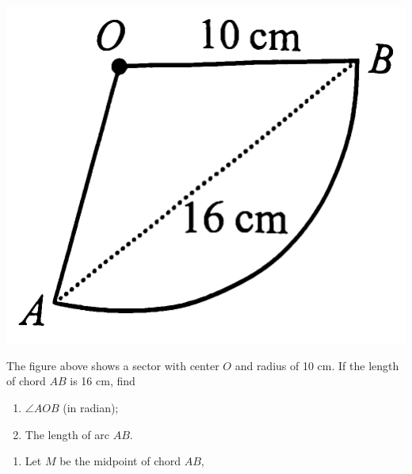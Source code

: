 \documentclass{report}
\begin{document}
\begin{question}
	\begin{center}
		\includegraphics[scale=0.09]{assets/8-6.png}
	\end{center}
	\noindent The figure above shows a sector with center $O$ and radius of 10 cm. If the length of chord $AB$ is 16 cm, find
	\vspace{-1em}
	\begin{multicols}{2}
		\begin{enumerate}[label=(\alph*)]
			\item $\angle AOB$ (in radian);
			\item The length of arc $AB$.
		\end{enumerate}
	\end{multicols}
	\vspace{-1em}
	\sol{}
	\begin{enumerate}[label=(\alph*)]
		\item \begin{multicols}{2}
		      Let $M$ be the midpoint of chord $AB$,
		              

\end{multicols}
\end{enumerate}
\end{question}
\end{document}
